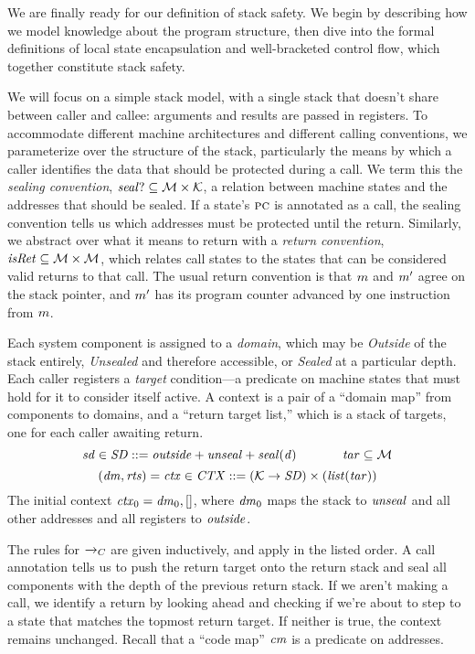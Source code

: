 \documentclass[acmsmall,review,anonymous]{acmart}\settopmatter{printfolios=true,printccs=false,printacmref=false}
\begin{document}
We are finally ready for our definition of stack safety. We begin
by describing how we model knowledge about the program structure,
then dive into the formal definitions of local state encapsulation and
well-bracketed control flow, which together constitute stack safety.

We will focus on a simple stack model, with a single stack
that doesn't share between caller and callee: arguments and results are passed
in registers. To accommodate different machine architectures and different calling
conventions, we parameterize over the structure of the stack, particularly
the means by
which a caller identifies the data that should be protected during a call. We term
this the {\em sealing convention}, \(\mathit{seal?} \subseteq {\mathcal M} \times {\mathcal K}\), a
relation between machine states and the addresses that should be sealed.
If a state's \(\textsc{pc}\) is annotated as a call, the sealing convention tells us
which addresses must be protected until the return. Similarly, we abstract over what
it means to return with a {\em return convention}, \(\mathit{isRet} \subseteq {\mathcal M} \times {\mathcal M}\),
which relates call states to the states that can be considered valid returns to that call.
The usual return convention is that \(m\) and \(m'\) agree on the stack pointer,
and \(m'\) has its program counter advanced by one instruction from \(m\).

Each system component is assigned to a {\em domain}, which may be {\em Outside}
of the stack entirely, {\em Unsealed} and therefore accessible, or {\em Sealed}
at a particular depth. Each caller registers a {\em target}
condition---a predicate on machine states that must hold for it to consider itself active.
A context is a pair of a ``domain map'' from components to domains, and a
``return target list,'' which is a stack of targets, one for each caller awaiting
return.  \ifaftersubmission{}\fi
%
\[\mathit{sd} \in \mathit{SD} ::= \mathit{outside} + \mathit{unseal} + \mathit{seal(d)} \hspace*{0.5in} \mathit{tar} \subseteq {\mathcal M}\]
\[(\mathit{dm},\mathit{rts}) = \mathit{ctx} \in \mathit{CTX} ::= ({\mathcal K} \rightarrow \mathit{SD})
  \times (\mathit{list} (\mathit{tar})) \]
%
The initial context \(\mathit{ctx}_0 = \mathit{dm}_0, []\), where \(\mathit{dm}_0\) maps
the stack to \(\mathit{unseal}\) and all other addresses and all registers to \(\mathit{outside}\).

The rules for \(\xrightarrow{}_C\) are given inductively, and apply in the listed order.
A call annotation tells us to push the return target onto the return stack and
seal all components with the depth of the previous return stack. If we aren't making a call,
we identify a return by looking ahead and checking if we're about to step to a state
that matches the topmost return target. If neither is true, the context remains unchanged.
Recall that a ``code map'' \(\mathit{cm}\) is a predicate on addresses.
\end{document}
